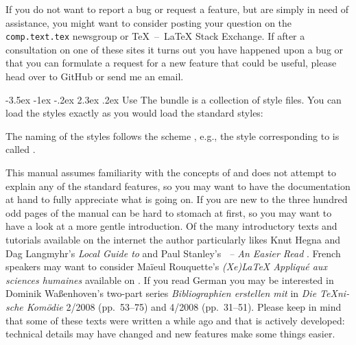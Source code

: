 \documentclass[11pt,a4paper]{article}
\makeatletter
\def\tex{TeX}%
\def\latex{LaTeX}%
\let\accentcolour\spotcolor
\newcommand*{\allsectionsfont}{\sffamily\accentcolour}
\renewcommand\section{\@startsection {section}{1}{\z@}%
                                     {-3.5ex \@plus -1ex \@minus -.2ex}%
                                     {2.3ex \@plus.2ex}%
                                     {\normalfont\Large\bfseries\allsectionsfont}}
\newcommand*{\ctan}{\mkbibacro{CTAN}}
\makeatother
\begin{document}
If you do not want to report a bug or request a feature, but are simply in need
of assistance, you might want to consider posting your question on the
\texttt{comp.text.tex} newsgroup or \tex{}~--~\latex{} Stack Exchange.%
If after a consultation on one of these sites it turns out you have happened
upon a bug or that you can formulate a request for a new feature that could be
useful, please head over to GitHub or send me an email.

\section{Use}\label{sec:use}
The  bundle is a collection of  style files.
You can load the styles exactly as you would load the standard styles:
\begin{biblatexcode}
\usepackage[style=(*@@*)]{biblatex}
\end{biblatexcode}
The naming of the styles follows the scheme
\mbox{}, e.g.,
the style corresponding to  is called
.

This manual assumes familiarity with the concepts of  and does
not attempt to explain any of the standard  features, so you may
want to have the  documentation%
at hand to fully appreciate what is going on.
If you are new to  the three hundred odd pages of the manual
can be hard to stomach at first, so you may want to have a look at a more
gentle introduction.
Of the many introductory texts and tutorials available on the internet%
the author particularly likes
Knut Hegna and Dag Langmyhr's \emph{Local Guide to }%
and Paul Stanley's \emph{~-- An Easier Read}%
.
French speakers may want to consider Maïeul Rouquette's
\foreignlanguage{french}{\emph{(Xe)\LaTeX{} Appliqué aux sciences humaines}}
available on \ctan{}.
If you read German you may be interested in Dominik Waßenhoven's two-part
series \foreignlanguage{ngerman}{\emph{Bibliographien erstellen mit
}} in \foreignlanguage{ngerman}{\emph{Die \TeX nische Komödie}}
2/2008 (pp.~53--75)
and 4/2008 (pp.~31--51).
Please keep in mind that some of these texts were written a while ago and
that  is actively developed: technical details may have changed
and new features make some things easier.
\end{document}
